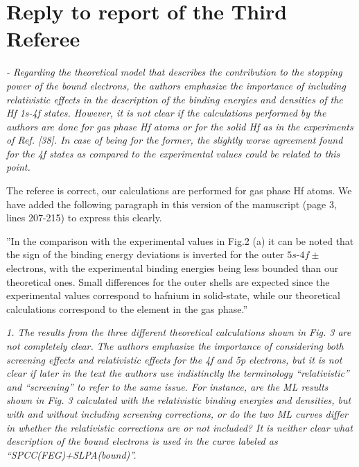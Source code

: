 \documentclass[a4paper,10pt]{article}
\begin{document}
\newpage
\section{Reply to report of the Third Referee}

\textsl{
- Regarding the theoretical model that describes the contribution to
the stopping power of the bound electrons, the authors emphasize the
importance of including relativistic effects in the description of the
binding energies and densities of the Hf 1s-4f states. However, it is
not clear if the calculations performed by the authors are done for
gas phase Hf atoms or for the solid Hf as in the experiments of Ref.
[38]. In case of being for the former, the slightly worse agreement
found for the 4f states as compared to the experimental values could
be related to this point.}

\vspace{0.1cm}
{\color{red} The referee is correct, our calculations are performed for gas phase Hf atoms. We have added the following paragraph in this version of the manuscript (page 3, lines 207-215) to express this clearly.}

{\small ''In the comparison with the experimental values in Fig.2 (a) it can be noted that the sign of the binding energy deviations is inverted for the outer $5s$-$4f\pm$ electrons, with the experimental binding energies being less bounded than our theoretical ones. Small differences for the outer shells are expected since  
the experimental values correspond to hafnium in solid-state, while our theoretical  calculations correspond to the element in the gas phase.''}

\vspace{0.25cm}
\textsl{
1. The results from the three different theoretical calculations shown
in Fig. 3 are not completely clear. The authors emphasize the
importance of considering both screening effects and relativistic
effects for the 4f and 5p electrons, but it is not clear if later in
the text the authors use indistinctly the terminology ``relativistic''
and ``screening'' to refer to the same issue. For instance, are the ML
results shown in Fig. 3 calculated with the relativistic binding
energies and densities, but with and without including screening
corrections, or do the two ML curves differ in whether the
relativistic corrections are or not included? It is neither clear what
description of the bound electrons is used in the curve labeled as
``SPCC(FEG)+SLPA(bound)''.}
\end{document}
